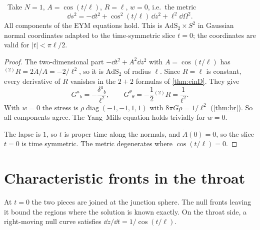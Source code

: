 \begin{theorem}\label{thm:throatevo}\ver\
Take $N=1$, $A=\cos(t/\ell)$, $R=\ell$, $w=0$, i.e.\ the metric
\[
\dd s^2=-\dd t^2+\cos^2(t/\ell)\,\dd z^2+\ell^2\dd\Omega^2 .
\]
All components of the EYM equations hold. This is $\mathrm{AdS}_2\times S^2$ in Gaussian normal coordinates adapted to the time-symmetric slice $t=0$; the coordinates are valid for $|t|<\pi\ell/2$.
\end{theorem}
\begin{proof}
The two-dimensional part $-\dd t^2+A^2\dd z^2$ with $A=\cos(t/\ell)$ has ${}^{(2)}\!R=2\ddot A/A=-2/\ell^2$, so it is $\mathrm{AdS}_2$ of radius $\ell$. Since $R=\ell$ is constant, every derivative of $R$ vanishes in the $2+2$ formulas of \cref{thm:einD}. They give
\[
G^a{}_b=-\frac{\delta^a{}_b}{\ell^2},\qquad G^\theta{}_\theta=-\frac12{}^{(2)}\!R=\frac1{\ell^2}.
\]
With $w=0$ the stress is $\rho\operatorname{diag}(-1,-1,1,1)$ with $8\pi G\rho=1/\ell^2$ (\cref{thm:br}). So all components agree. The Yang--Mills equation holds trivially for $w=0$.

The lapse is $1$, so $t$ is proper time along the normals, and $\dot A(0)=0$, so the slice $t=0$ is time symmetric. The metric degenerates where $\cos(t/\ell)=0$.
\end{proof}


\section{Characteristic fronts in the throat}

At $t=0$ the two pieces are joined at the junction sphere. The null fronts leaving it bound the regions where the solution is known exactly. On the throat side, a right-moving null curve satisfies $\dd z/\dd t=1/\cos(t/\ell)$.

